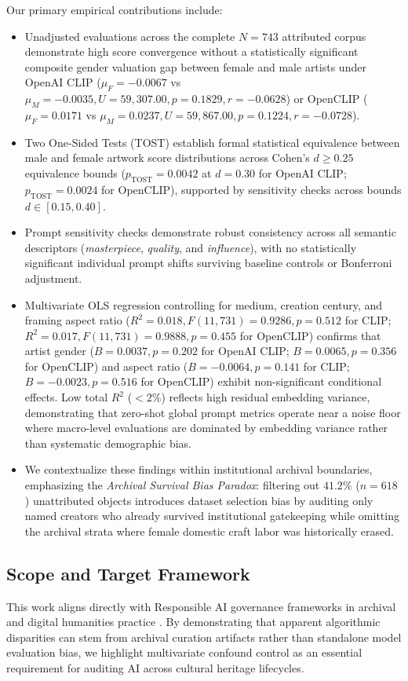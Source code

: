 \documentclass[pdflatex,sn-mathphys-num]{sn-jnl}%
\theoremstyle{thmstyleone}%
\theoremstyle{thmstyletwo}%
\theoremstyle{thmstylethree}%
\begin{document}
Our primary empirical contributions include:
\begin{itemize}
    \item Unadjusted evaluations across the complete $N=743$ attributed corpus demonstrate high score convergence without a statistically significant composite gender valuation gap between female and male artists under OpenAI CLIP ($\mu_F = -0.0067$ vs $\mu_M = -0.0035, U = 59,307.00, p = 0.1829, r = -0.0628$) or OpenCLIP ($\mu_F = 0.0171$ vs $\mu_M = 0.0237, U = 59,867.00, p = 0.1224, r = -0.0728$).
    \item Two One-Sided Tests (TOST) establish formal statistical equivalence between male and female artwork score distributions across Cohen's $d \ge 0.25$ equivalence bounds ($p_{\text{TOST}} = 0.0042$ at $d=0.30$ for OpenAI CLIP; $p_{\text{TOST}} = 0.0024$ for OpenCLIP), supported by sensitivity checks across bounds $d \in [0.15, 0.40]$.
    \item Prompt sensitivity checks demonstrate robust consistency across all semantic descriptors (\textit{masterpiece}, \textit{quality}, and \textit{influence}), with no statistically significant individual prompt shifts surviving baseline controls or Bonferroni adjustment.
    \item Multivariate OLS regression controlling for medium, creation century, and framing aspect ratio ($R^2 = 0.018, F(11, 731) = 0.9286, p = 0.512$ for CLIP; $R^2 = 0.017, F(11, 731) = 0.9888, p = 0.455$ for OpenCLIP) confirms that artist gender ($B = 0.0037, p = 0.202$ for OpenAI CLIP; $B = 0.0065, p = 0.356$ for OpenCLIP) and aspect ratio ($B = -0.0064, p = 0.141$ for CLIP; $B = -0.0023, p = 0.516$ for OpenCLIP) exhibit non-significant conditional effects. Low total $R^2$ ($<2\%$) reflects high residual embedding variance, demonstrating that zero-shot global prompt metrics operate near a noise floor where macro-level evaluations are dominated by embedding variance rather than systematic demographic bias.
    \item We contextualize these findings within institutional archival boundaries, emphasizing the \textit{Archival Survival Bias Paradox}: filtering out $41.2\%$ ($n=618$) unattributed objects introduces dataset selection bias by auditing only named creators who already survived institutional gatekeeping while omitting the archival strata where female domestic craft labor was historically erased.
\end{itemize}

\subsection{Scope and Target Framework}
This work aligns directly with Responsible AI governance frameworks in archival and digital humanities practice \cite{dignum2019responsible, stahl2021responsible, mitchell2019model, jobin2019global}. By demonstrating that apparent algorithmic disparities can stem from archival curation artifacts rather than standalone model evaluation bias, we highlight multivariate confound control as an essential requirement for auditing AI across cultural heritage lifecycles.
\end{document}
